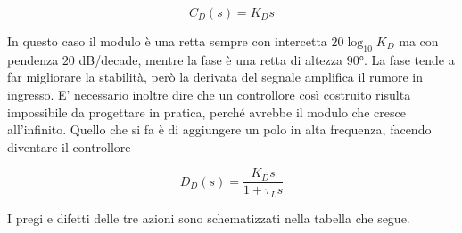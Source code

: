 \documentclass[english]{article}
\begin{document}
	   		\begin{equation*}
	   			C_D(s)=K_Ds
	   		\end{equation*} 
	   		
	   		\noindent In questo caso il modulo è una retta sempre con intercetta $20\log_{10}K_D$ ma con pendenza $20$ dB/decade, mentre la fase è una retta di altezza $90°$. La fase tende a far migliorare la stabilità, però la derivata del segnale amplifica il rumore in ingresso. E' necessario inoltre dire che un controllore così costruito risulta impossibile da progettare in pratica, perché avrebbe il modulo che cresce all'infinito. Quello che si fa è di aggiungere un polo in alta frequenza, facendo diventare il controllore
	   		
	   		\begin{equation*}
	   			D_D(s)=\frac{K_Ds}{1+\tau_Ls}
	   		\end{equation*} 	 
	
		\noindent I pregi e difetti delle tre azioni sono schematizzati nella tabella che segue.	
	
\end{document}
